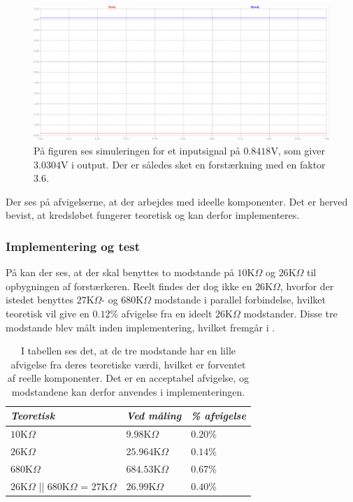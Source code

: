 \begin{figure}[H]
	\centering
	\includegraphics[scale=0.3]{figures/cProblemloesning/Forstaerker_faktor3_simulering.PNG}
	\caption{På figuren ses simuleringen for et inputsignal på $0.8418$V, som giver $3.0304$V i output. Der er således sket en forstærkning med en faktor $3.6$.}
	\label{fig:faktor3_simulering}
\end{figure}
\noindent Der ses på afvigelserne, at der arbejdes med ideelle komponenter. Det er herved bevist, at kredsløbet fungerer teoretisk og kan derfor implementeres.

\subsubsection{Implementering og test}
På  kan der ses, at der skal benyttes to modstande på $10$K$\Omega$ og $26$K$\Omega$ til opbygningen af forstærkeren. Reelt findes der dog ikke en $26$K$\Omega$, hvorfor der istedet benyttes $27$K$\Omega$- og $680$K$\Omega$ modstande i parallel forbindelse, hvilket teoretisk vil give en $0.12$\% afvigelse fra en ideelt $26$K$\Omega$ modstander. Disse tre modstande blev målt inden implementering, hvilket fremgår i .
\begin{table}[H]
	\centering
	\begin{tabular}{|l|l|l|}
		\hline
		\textit{Teoretisk}  & \textit{Ved måling} & \textit{\% afvigelse} \\ \hline
		$10$K$\Omega$       & $9.98$K$\Omega$     & $0.20$\%               \\ \hline
		$26$K$\Omega$      &  $25.964$K$\Omega$   & $0.14$\% \\ \hline
		$680$K$\Omega$      & $684.53$K$\Omega$   & $0.67$\%               \\ \hline
$26$K$\Omega$ || $680$K$\Omega$ = $27$K$\Omega$       & $26.99$K$\Omega$    & $0.40$\%               \\ \hline
	\end{tabular}
	\caption{I tabellen ses det, at de tre modstande har en lille afvigelse fra deres teoretiske værdi, hvilket er forventet af reelle komponenter. Det er en acceptabel afvigelse, og modstandene kan derfor anvendes i implementeringen.}
	\label{Tab:modstand_faktor18}
\end{table}

